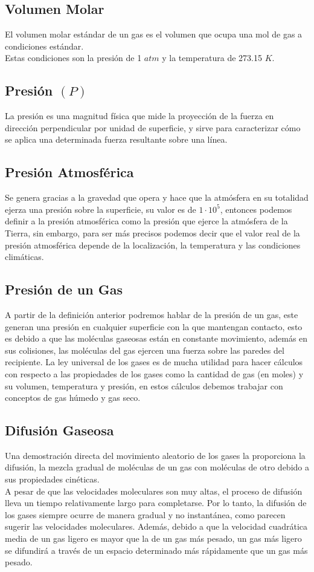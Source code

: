 \documentclass[../main.tex]{subfiles}
\begin{document}
\subsection{Volumen Molar}
El volumen molar estándar de un gas es el volumen que ocupa una mol de gas a 
condiciones estándar. \\
Estas condiciones son la presión de 1 $atm$
y la temperatura de 273.15 $K$. \cite{lab}

\subsection{Presión $(P)$}
La presión es una magnitud física que mide la proyección de la fuerza en
dirección perpendicular por unidad de superficie, y sirve para caracterizar 
cómo se aplica una determinada fuerza resultante sobre una
línea. \cite{pression}

\subsection{Presión Atmosférica}
Se genera gracias a la gravedad que opera y hace que la atmósfera en su totalidad 
ejerza una presión sobre la superficie, su valor es de $1 \cdot 10^5$, entonces podemos 
definir a la presión atmosférica como la presión que ejerce la atmósfera de la Tierra, 
sin embargo, para ser más precisos podemos decir que el valor real de la presión 
atmosférica depende de la localización, la temperatura y las condiciones climáticas.

\subsection{Presión de un Gas}
A partir de la definición anterior podremos hablar de la presión de un gas, 
este generan una presión en cualquier superficie con la que mantengan 
contacto, esto es debido a que las moléculas gaseosas están en constante 
movimiento, además en sus colisiones, las moléculas del gas ejercen una fuerza 
sobre las paredes del recipiente.
La ley universal de los gases es de mucha utilidad para hacer cálculos con respecto 
a las propiedades de los gases como la cantidad de gas (en moles) y su volumen, 
temperatura y presión, en estos cálculos debemos trabajar con conceptos de gas 
húmedo y gas seco.\cite{chang}

\subsection{Difusión Gaseosa}
Una demostración directa del movimiento aleatorio de los 
gases la proporciona la difusión, la mezcla gradual de moléculas
de un gas con moléculas de otro debido a sus propiedades 
cinéticas. \\
A pesar de que las velocidades moleculares son muy altas, el 
proceso de difusión lleva un tiempo relativamente largo para 
completarse. Por lo tanto, la difusión de los gases 
siempre ocurre de manera gradual y no instantánea, como parecen
sugerir las velocidades moleculares. Además, debido a que 
la velocidad cuadrática media de un gas ligero es mayor que 
la de un gas más pesado,
un gas más ligero se difundirá a través de un 
espacio determinado más rápidamente que un gas más pesado. \cite{chang}
\end{document}
